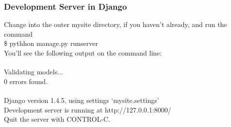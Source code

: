 \noindent \subsubsection{Development Server in Django}  Change into 
the outer mysite directory, if you haven't already, and run the command 
\\ \$ pythhon manage.py runserver\\You'll see the following output on 
the command line:\\\\
Validating models...\\
0 errors found.\\\\
Django version 1.4.5, using settings `mysite.settings'\\
Development server is running at http://127.0.0.1:8000/\\
Quit the server with CONTROL-C.

